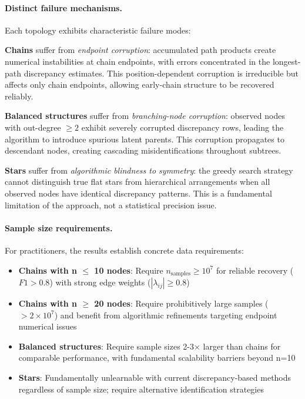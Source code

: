 \documentclass[11pt,a4paper]{article}
\numberwithin{equation}{section}
\begin{document}
\paragraph{Distinct failure mechanisms.} Each topology exhibits characteristic failure modes:

\textbf{Chains} suffer from \emph{endpoint corruption}: accumulated path products create numerical instabilities at chain endpoints, with errors concentrated in the longest-path discrepancy estimates. This position-dependent corruption is irreducible but affects only chain endpoints, allowing early-chain structure to be recovered reliably.

\textbf{Balanced structures} suffer from \emph{branching-node corruption}: observed nodes with out-degree $\geq 2$ exhibit severely corrupted discrepancy rows, leading the algorithm to introduce spurious latent parents. This corruption propagates to descendant nodes, creating cascading misidentifications throughout subtrees.

\textbf{Stars} suffer from \emph{algorithmic blindness to symmetry}: the greedy search strategy cannot distinguish true flat stars from hierarchical arrangements when all observed nodes have identical discrepancy patterns. This is a fundamental limitation of the approach, not a statistical precision issue.

\paragraph{Sample size requirements.} For practitioners, the results establish concrete data requirements:

\begin{itemize}
\item \textbf{Chains with n $\leq$ 10 nodes}: Require $n_{\text{samples}} \geq 10^7$ for reliable recovery ($F1 > 0.8$) with strong edge weights ($|\lambda_{ij}| \geq 0.8$)
\item \textbf{Chains with n $\geq$ 20 nodes}: Require prohibitively large samples ($> 2 \times 10^7$) and benefit from algorithmic refinements targeting endpoint numerical issues
\item \textbf{Balanced structures}: Require sample sizes 2-3× larger than chains for comparable performance, with fundamental scalability barriers beyond n=10
\item \textbf{Stars}: Fundamentally unlearnable with current discrepancy-based methods regardless of sample size; require alternative identification strategies
\end{itemize}
\end{document}
